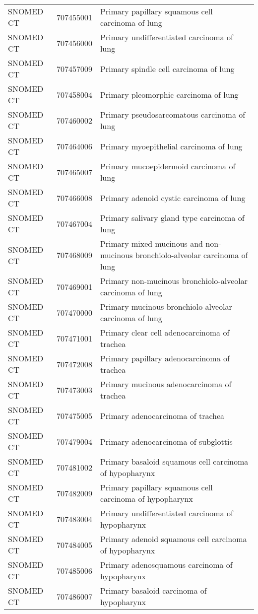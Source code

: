 \begin{longtable}{p{}p{}p{}}
  SNOMED CT & 707455001 & Primary papillary squamous cell carcinoma of lung \\ 
  SNOMED CT & 707456000 & Primary undifferentiated carcinoma of lung \\ 
  SNOMED CT & 707457009 & Primary spindle cell carcinoma of lung \\ 
  SNOMED CT & 707458004 & Primary pleomorphic carcinoma of lung \\ 
  SNOMED CT & 707460002 & Primary pseudosarcomatous carcinoma of lung \\ 
  SNOMED CT & 707464006 & Primary myoepithelial carcinoma of lung \\ 
  SNOMED CT & 707465007 & Primary mucoepidermoid carcinoma of lung \\ 
  SNOMED CT & 707466008 & Primary adenoid cystic carcinoma of lung \\ 
  SNOMED CT & 707467004 & Primary salivary gland type carcinoma of lung \\ 
  SNOMED CT & 707468009 & Primary mixed mucinous and non-mucinous bronchiolo-alveolar carcinoma of lung \\ 
  SNOMED CT & 707469001 & Primary non-mucinous bronchiolo-alveolar carcinoma of lung \\ 
  SNOMED CT & 707470000 & Primary mucinous bronchiolo-alveolar carcinoma of lung \\ 
  SNOMED CT & 707471001 & Primary clear cell adenocarcinoma of trachea \\ 
  SNOMED CT & 707472008 & Primary papillary adenocarcinoma of trachea \\ 
  SNOMED CT & 707473003 & Primary mucinous adenocarcinoma of trachea \\ 
  SNOMED CT & 707475005 & Primary adenocarcinoma of trachea \\ 
  SNOMED CT & 707479004 & Primary adenocarcinoma of subglottis \\ 
  SNOMED CT & 707481002 & Primary basaloid squamous cell carcinoma of hypopharynx \\ 
  SNOMED CT & 707482009 & Primary papillary squamous cell carcinoma of hypopharynx \\ 
  SNOMED CT & 707483004 & Primary undifferentiated carcinoma of hypopharynx \\ 
  SNOMED CT & 707484005 & Primary adenoid squamous cell carcinoma of hypopharynx \\ 
  SNOMED CT & 707485006 & Primary adenosquamous carcinoma of hypopharynx \\ 
  SNOMED CT & 707486007 & Primary basaloid carcinoma of hypopharynx \\ 

\end{longtable}
